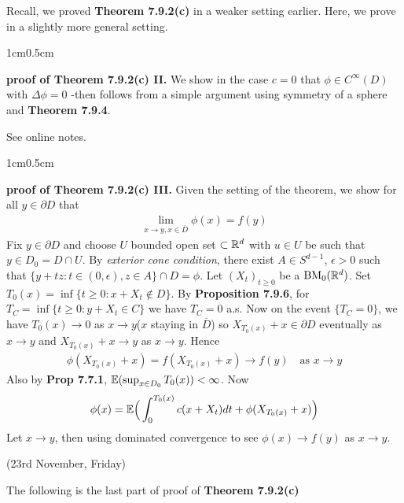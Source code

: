 \documentclass[12pt,a4paper]{report}
\newenvironment{proof}
{\begin{changemargin}{1cm}{0.5cm} 
	}%
	{\end{changemargin}
}
\begin{document}
Recall, we proved \textbf{Theorem 7.9.2(c)} in a weaker setting earlier. Here, we prove in a slightly more general setting.
\begin{proof}
\textbf{proof of Theorem 7.9.2(c) II.} We show in the case $c=0$ that $\phi \in C^{\infty}(D)$ with $\Delta \phi =0$ -then follows from a simple argument using symmetry of a sphere and \textbf{Theorem 7.9.4}.

See online notes.
\end{proof}
\s

\begin{proof}
\textbf{proof of Theorem 7.9.2(c) III.} Given the setting of the theorem, we show for all $y \in \partial D$ that
\begin{align*}
\lim_{x\rightarrow y, x\in \overline{D}} \phi(x) = f(y)
\end{align*}
Fix $y\in \partial D$ and choose $U$ bounded open set $\subset \mathbb{R}^d$ with $u\in U$ be such that $y\in D_0=D\cap U$. By \emph{exterior cone condition}, there exist $A\in S^{d-1}$, $\epsilon>0$ such that $\{y+tz : t \in (0,\epsilon) , z\in A \} \cap D = \phi$. Let $(X_t)_{t\geq 0}$ be a $\text{BM}_0(\mathbb{R}^d)$. Set $T_0(x) = \inf \{ t\geq 0: x+ X_t \not\in D \}$. By \textbf{Proposition 7.9.6}, for $T_C = \inf \{t\geq 0 : y+X_t \in C \}$ we have $T_C =0$ a.s. Now on the event $\{ T_C =0 \}$, we have $T_0(x) \rightarrow 0$ as $x\rightarrow y$($x$ staying in $\overline{D}$) so $X_{T_0(x)} + x \in \partial D$ eventually as $x\rightarrow y$ and $X_{T_0(x)} +x \rightarrow y$ as $x\rightarrow y$. Hence
\begin{align*}
\phi(X_{T_0(x)} +x) = f(X_{T_0(x)} +x) \rightarrow f(y) \quad \text{as }x\rightarrow y
\end{align*}
Also by \textbf{Prop 7.7.1}, $\mathbb{E}(\sup_{x\in D_0} T_0(x)) < \infty$. Now
\begin{align*}
\phi(x) = \mathbb{E} \Big( \int_0^{T_0(x)} c(x+X_t)dt + \phi(X_{T_0(x)} + x) \Big)
\end{align*}
Let $x\rightarrow y$, then using dominated convergence to see $\phi(x) \rightarrow f(y)$ as $x\rightarrow y$.

\eop
\end{proof}
\s

\newday

(23rd November, Friday)
\s

The following is the last part of proof of \textbf{Theorem 7.9.2(c)}
\s
\end{document}
